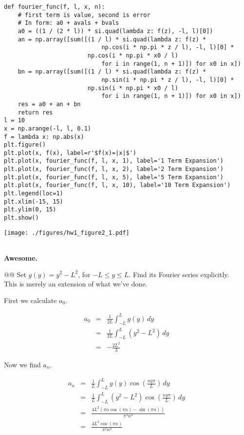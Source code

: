 \documentclass[10pt]{article}
\begin{document}
\begin{easylist}[enumerate]
\begin{minipage}{\dimexpr\textwidth-1cm}
\begin{verbatim}
def fourier_func(f, l, x, n):
    # first term is value, second is error
    # In form: a0 + avals + bvals
    a0 = ((1 / (2 * l)) * si.quad(lambda z: f(z), -l, l)[0])
    an = np.array([sum([(1 / l) * si.quad(lambda z: f(z) *
                            np.cos(i * np.pi * z / l), -l, l)[0] *
                        np.cos(i * np.pi * x0 / l)
                            for i in range(1, n + 1)]) for x0 in x])
    bn = np.array([sum([(1 / l) * si.quad(lambda z: f(z) *
                            np.sin(i * np.pi * z / l), -l, l)[0] *
                        np.sin(i * np.pi * x0 / l)
                            for i in range(1, n + 1)]) for x0 in x])
    res = a0 + an + bn
    return res
l = 10
x = np.arange(-l, l, 0.1)
f = lambda x: np.abs(x)
plt.figure()
plt.plot(x, f(x), label=r'$f(x)=|x|$')
plt.plot(x, fourier_func(f, l, x, 1), label='1 Term Expansion')
plt.plot(x, fourier_func(f, l, x, 2), label='2 Term Expansion')
plt.plot(x, fourier_func(f, l, x, 5), label='5 Term Expansion')
plt.plot(x, fourier_func(f, l, x, 10), label='10 Term Expansion')
plt.legend(loc=1)
plt.xlim(-15, 15)
plt.ylim(0, 15)
plt.show()
\end{verbatim}
\texttt{[image: ./figures/hw1\_figure2\_1.pdf]}

\xdef\tpd{\the\prevdepth}
\end{minipage}\\

    \textbf{Awesome.}

    @@ Set $g(y) = y^2 - L^2$, for $-L \le y \le L$. Find its Fourier series explicitly.\\

    This is merely an extension of what we've done.

    First we calculate $a_0$.

    \begin{align*}
        a_0 &=& \frac{1}{2L} \int_{-L}^L g(y) \, dy\\
        &=& \frac{1}{2L} \int_{-L}^L \left( y^2 - L^2 \right) \, dy\\
        &=& -\frac{2 L^2}{3}
    \end{align*}

    Now we find $a_n$.

    \begin{align*}
        a_n &=& \frac{1}{L} \int_{-L}^L g(y) \cos \left( \frac{n y \pi}{L} \right) \, dy\\
        &=& \frac{1}{L} \int_{-L}^L (y^2 - L^2) \cos \left( \frac{n y \pi}{L} \right) \, dy\\
        &=& \frac{4 L^2 (\pi  n \cos (\pi  n)-\sin (\pi n))}{\pi ^3 n^3}\\
        &=& \frac{4 L^2 \cos (\pi  n)}{\pi^2 n^2}\\
    \end{align*}


\end{easylist}
\end{document}
